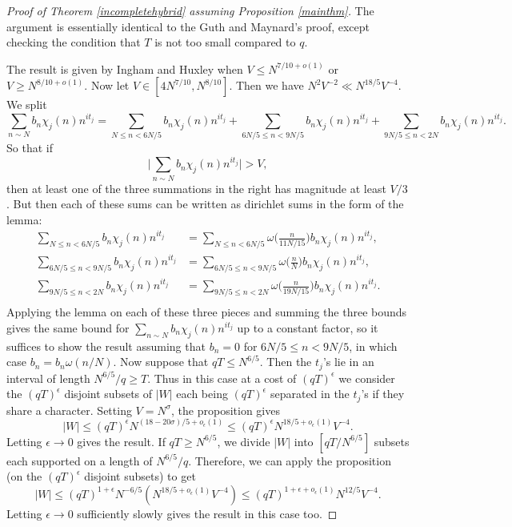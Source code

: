 \begin{proof}[Proof of Theorem \ref{incompletehybrid} assuming Proposition \ref{mainthm}]
The argument is essentially identical to the Guth and Maynard's proof, except checking the condition that $T$ is not too small compared to $q$.

The result is given by Ingham and Huxley when $V\leq N^{7/10+o(1)}$ or $V\geq N^{8/10+o(1)}$. Now let $V\in [4N^{7/10},N^{8/10}]$. Then we have $N^2V^{-2}\ll N^{18/5}V^{-4}$.
We split \[
\sum_{n\sim N} b_n\chi_j(n)n^{it_j}=\sum_{N\leq n< 6N/5} b_n\chi_j(n)n^{it_j} +\sum_{6N/5 \leq n < 9N/5} b_n\chi_j(n)n^{it_j} +\sum_{9N/5 \leq n < 2N} b_n\chi_j(n)n^{it_j}.
\]
So that if \[
\Big|\sum_{n\sim N} b_n\chi_j(n)n^{it_j}\Big|>V,
\]
then at least one of the three summations in the right has magnitude at least $V/3$.
But then each of these sums can be written as dirichlet sums in the form of the lemma: \begin{align*}
	\sum_{N\leq n< 6N/5} b_n\chi_j(n)n^{it_j} &=  \sum_{N\leq n< 6N/5} \omega\Bigg(\frac{n}{11N/15}\Bigg) b_n\chi_j(n)n^{it_j}, \\
	\sum_{6N/5 \leq n < 9N/5} b_n\chi_j(n)n^{it_j} &=  \sum_{6N/5 \leq n < 9N/5} \omega\Bigg(\frac{n}{N}\Bigg) b_n\chi_j(n)n^{it_j}, \\
	\sum_{9N/5 \leq n < 2N}  b_n\chi_j(n)n^{it_j} &=  \sum_{9N/5 \leq n < 2N}  \omega\Bigg(\frac{n}{19N/15}\Bigg) b_n\chi_j(n)n^{it_j}. \\
\end{align*}
Applying the lemma on each of these three pieces and summing the three bounds gives the same bound for $\sum_{n\sim N} b_n\chi_j(n)n^{it_j}$ up to a constant factor, so it suffices to show the result assuming that
$b_n=0$ for $6N/5 \leq n < 9N/5$, in which case $b_n=b_n\omega(n/N)$.
Now suppose that $qT\leq N^{6/5}$. Then the $t_j$'s lie in an interval of length $N^{6/5}/q\geq T$. Thus in this case at a cost of $(qT)^{\epsilon}$ we consider the $(qT)^{\epsilon}$ disjoint subsets of $|W|$ each
being $(qT)^{\epsilon}$ separated in the $t_j$'s if they share a character. Setting $V=N^{\sigma}$, the proposition gives\[
|W|\leq (qT)^{\epsilon} N^{(18-20\sigma)/5+o_{\epsilon}(1)} \leq (qT)^{\epsilon} N^{18/5+o_{\epsilon}(1)}V^{-4}.
\] 
Letting $\epsilon\to 0$ gives the result. If $qT\geq N^{6/5}$, we divide $|W|$ into $[qT/N^{6/5}]$ subsets each supported on a length of $N^{6/5}/q$. Therefore, we can apply the proposition (on the $(qT)^\epsilon$ disjoint subsets) to get \[
|W|\leq (qT)^{1+\epsilon}  N^{-6/5}(N^{18/5+o_{\epsilon}(1)}V^{-4})\leq (qT)^{1+\epsilon+o_\epsilon(1)}N^{12/5}V^{-4}.
\] 
Letting $\epsilon\to 0$ sufficiently slowly gives the result in this case too.
\end{proof}
	
